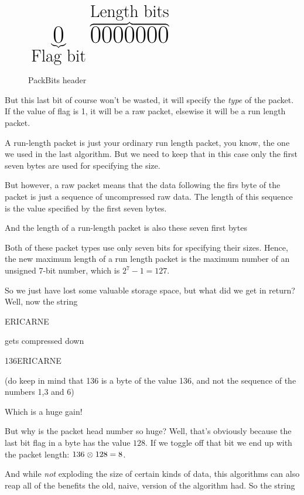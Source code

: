 \begin{refsection}
\begin{figure}
  \centering
  $\mbox{\fontsize{30}{0} $\underbrace{0}_\text{Flag bit}\overbrace{0000000}^\text{Length bits}$}$
  \caption{PackBits header}
  \label{fig:packbits-header}
\end{figure}

But this last bit of course won't be wasted, it will specify the
\textit{type} of the packet. If the value of flag is 1, it will be a
raw packet, elsewise it will be a run length packet.

A run-length packet is just your ordinary run length packet, you know,
the one we used in the last algorithm. But we need to keep that in
this case only the first seven bytes are used for specifying the size.

But however, a raw packet means that the data following the firs byte
of the packet is just a sequence of uncompressed raw data. The length
of this sequence is the value specified by the first seven bytes.

And the length of a run-length packet is also these seven first
bytes

Both of these packet types use only seven bits for specifying their
sizes. Hence, the new maximum length of a run length packet is the
maximum number of an unsigned 7-bit number, which is $2^7 -1 = 127$.

So we just have lost some valuable storage space, but what did we get in
return? Well, now the string

\begin{indentpar}
  ERICARNE
\end{indentpar}

gets compressed down

\begin{indentpar}
  136ERICARNE
\end{indentpar}

(do keep in mind that 136 is a byte of the value 136, and not the
sequence of the numbers 1,3 and 6)

Which is a huge gain!

But why is the packet head number so huge? Well, that's obviously
because the last bit flag in a byte has the value $128$. If we toggle
off that bit we end up with the packet length: $136 \mathrel{\otimes} 128 = 8$.

And while \textit{not} exploding the size of certain kinds of data,
this algorithms can also reap all of the benefits the old, naive, version
of the algorithm had. So the string


\end{refsection}

